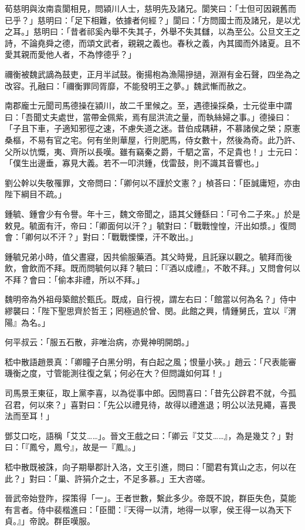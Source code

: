 荀慈明與汝南袁閬相見，問潁川人士，慈明先及諸兄。閬笑曰：「士但可因親舊而已乎？」慈明曰：「足下相難，依據者何經？」閬曰：「方問國士而及諸兄，是以尤之耳。」慈明曰：「昔者祁奚內舉不失其子，外舉不失其讎，以為至公。公旦文王之詩，不論堯舜之德，而頌文武者，親親之義也。春秋之義，內其國而外諸夏。且不愛其親而愛他人者，不為悖德乎？」

禰衡被魏武謫為鼓吏，正月半試鼓。衡揚枹為漁陽摻撾，淵淵有金石聲，四坐為之改容。孔融曰：「禰衡罪同胥靡，不能發明王之夢。」魏武慚而赦之。

南郡龐士元聞司馬德操在潁川，故二千里候之。至，遇德操採桑，士元從車中謂曰：「吾聞丈夫處世，當帶金佩紫，焉有屈洪流之量，而執絲婦之事。」德操曰：「子且下車，子適知邪徑之速，不慮失道之迷。昔伯成耦耕，不慕諸侯之榮；原憲桑樞，不易有官之宅。何有坐則華屋，行則肥馬，侍女數十，然後為奇。此乃許、父所以忼慨，夷、齊所以長嘆。雖有竊秦之爵，千駟之富，不足貴也！」士元曰：「僕生出邊垂，寡見大義。若不一叩洪鍾，伐雷鼓，則不識其音響也。」

劉公幹以失敬罹罪，文帝問曰：「卿何以不謹於文憲？」楨荅曰：「臣誠庸短，亦由陛下綱目不疏。」

鍾毓、鍾會少有令譽。年十三，魏文帝聞之，語其父鍾繇曰：「可令二子來。」於是敕見。毓面有汗，帝曰：「卿面何以汗？」毓對曰：「戰戰惶惶，汗出如漿。」復問會：「卿何以不汗？」對曰：「戰戰慄慄，汗不敢出。」

鍾毓兄弟小時，值父晝寢，因共偷服藥酒。其父時覺，且託寐以觀之。毓拜而後飲，會飲而不拜。既而問毓何以拜？毓曰：「『酒以成禮』，不敢不拜。」又問會何以不拜？會曰：「偷本非禮，所以不拜。」

魏明帝為外祖母築館於甄氏。既成，自行視，謂左右曰：「館當以何為名？」侍中繆襲曰：「陛下聖思齊於哲王；罔極過於曾、閔。此館之興，情鍾舅氏，宜以『渭陽』為名。」

何平叔云：「服五石散，非唯治病，亦覺神明開朗。」

嵇中散語趙景真：「卿瞳子白黑分明，有白起之風；恨量小狹。」趙云：「尺表能審璣衡之度，寸管能測往復之氣；何必在大？但問識如何耳！」

司馬景王東征，取上黨李喜，以為從事中郎。因問喜曰：「昔先公辟君不就，今孤召君，何以來？」喜對曰：「先公以禮見待，故得以禮進退；明公以法見繩，喜畏法而至耳！」

鄧艾口吃，語稱「艾艾……」。晉文王戲之曰：「卿云『艾艾……』，為是幾艾？」對曰：「『鳳兮，鳳兮』，故是一『鳳』。」

嵇中散既被誅，向子期舉郡計入洛，文王引進，問曰：「聞君有箕山之志，何以在此？」對曰：「巢、許狷介之士，不足多慕。」王大咨嗟。

晉武帝始登阼，探策得「一」。王者世數，繫此多少。帝既不說，群臣失色，莫能有言者。侍中裴楷進曰：「臣聞：『天得一以清，地得一以寧，侯王得一以為天下貞。』」帝說。群臣嘆服。

